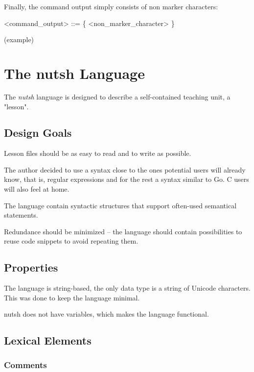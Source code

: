 \documentclass[twoside,parskip]{scrreprt}
\begin{document}
Finally, the command output simply consists of non marker characters:

\begin{grammar}
<command_output> ::= \{ <non_marker_character> \}
\end{grammar}


(example)

\chapter{The nutsh Language}

The \emph{nutsh} language is designed to describe a self-contained teaching unit, a "lesson".

\section{Design Goals}

Lesson files should be as easy to read and to write as possible.

The author decided to use a syntax close to the ones potential users will already know, that is, regular expressions and for the rest a syntax similar to Go. C users will also feel at home.

The language contain syntactic structures that support often-used semantical statements.

Redundance should be minimized -- the language should contain possibilities to reuse code snippets to avoid repeating them.

\section{Properties}

The language is string-based, the only data type is a string of Unicode characters. This was done to keep the language minimal.

nutsh does not have variables, which makes the language functional.

\section{Lexical Elements}

\subsection{Comments}
\end{document}
